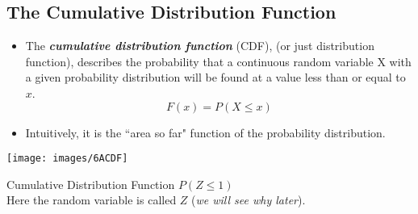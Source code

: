 \documentclass[a4paper,12pt]{article}
\begin{document}
\subsection*{The Cumulative Distribution Function }
\begin{itemize}
	\item The \textbf{\emph{cumulative distribution function}} (CDF), (or just distribution function), describes the probability that a continuous random variable X with a given probability distribution will be found at a value less than or equal to $x$.\\
	
	\[ F(x) = P(X \leq x) \]
	
	\item Intuitively, it is the ``area so far" function of the probability distribution.
\end{itemize}


\begin{center}
	\texttt{[image: images/6ACDF]}
\end{center}
Cumulative Distribution Function $P(Z \leq 1)$ \\ Here the random variable is called $Z$ (\textit{we will see why later}).
\end{document}
